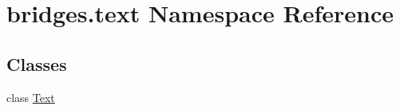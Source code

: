 \hypertarget{namespacebridges_1_1text}{}\section{bridges.\+text Namespace Reference}
\label{namespacebridges_1_1text}
\subsection*{Classes}
\begin{DoxyCompactItemize}
\item 
class \hyperlink{classbridges_1_1text_1_1_text}{Text}
\end{DoxyCompactItemize}
